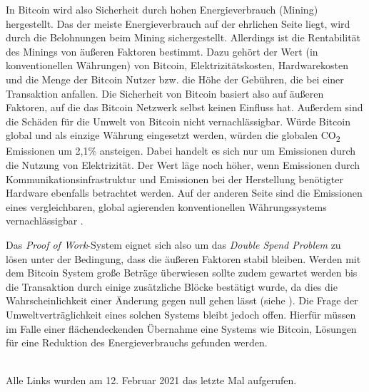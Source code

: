 \documentclass[ngerman,runningheads,a4paper]{llncs}[2018/03/10]
\begin{document}
In Bitcoin wird also Sicherheit durch hohen Energieverbrauch (Mining) hergestellt. Das der meiste Energieverbrauch auf der ehrlichen Seite liegt, wird durch die Belohnungen beim Mining sichergestellt. Allerdings ist die Rentabilität des Minings von äußeren Faktoren bestimmt. Dazu gehört der Wert (in konventionellen Währungen) von Bitcoin, Elektrizitätskosten, Hardwarekosten und die Menge der Bitcoin Nutzer bzw. die Höhe der Gebühren, die bei einer Transaktion anfallen. Die Sicherheit von Bitcoin basiert also auf äußeren Faktoren, auf die das Bitcoin Netzwerk selbst keinen Einfluss hat. Außerdem sind die Schäden für die Umwelt von Bitcoin nicht vernachlässigbar. Würde Bitcoin global und als einzige Währung eingesetzt werden, würden die globalen CO\textsubscript{2} Emissionen um 2,1\% ansteigen. Dabei handelt es sich nur um Emissionen durch die Nutzung von Elektrizität. Der Wert läge noch höher, wenn Emissionen durch Kommunikationsinfrastruktur und Emissionen bei der Herstellung benötigter Hardware ebenfalls betrachtet werden. Auf der anderen Seite sind die Emissionen eines vergleichbaren, global agierenden  konventionellen Währungssystems vernachlässigbar \citep{Becker2013}. 

Das \textit{Proof of Work}-System eignet sich also um das \textit{Double Spend Problem} zu lösen unter der Bedingung, dass die äußeren Faktoren stabil bleiben. Werden mit dem Bitcoin System große Beträge überwiesen sollte zudem gewartet werden bis die Transaktion durch einige zusätzliche Blöcke bestätigt wurde, da dies die Wahrscheinlichkeit einer Änderung gegen null gehen lässt (siehe ). Die Frage der Umweltverträglichkeit eines solchen Systems bleibt jedoch offen. Hierfür müssen im Falle einer flächendeckenden Übernahme eine Systems wie Bitcoin, Lösungen für eine Reduktion des Energieverbrauchs gefunden werden. 

\renewcommand{\bibsection}{\section*{Referenzen}} %

\begingroup
  \ifluatex
  \else
  \fi
  \small %
  
\endgroup

\ \\
%
Alle Links wurden am 12. Februar 2021 das letzte Mal aufgerufen.
\end{document}
